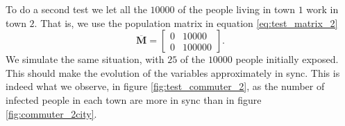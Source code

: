 To do a second test we let all the $10000$ of the people living in town $1$ work in town $2$. That is, we use the population matrix in equation \eqref{eq:test_matrix_2}
\begin{equation}\label{eq:test_matrix_2}
	\mathbf{\overline{M}} = \begin{bmatrix}
		0 & 10000 \\
		0 & 100000 
	\end{bmatrix}.
\end{equation}
We simulate the same situation, with $25$ of the $10000$ people initially exposed. This should make the evolution of the variables approximately in sync. This is indeed what we observe, in figure \ref{fig:test_commuter_2}, as the number of infected people in each town are more in sync than in figure \ref{fig:commuter_2city}.

